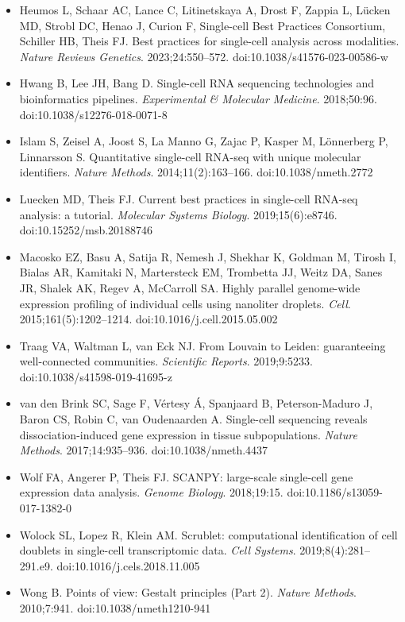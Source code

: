 \begin{itemize}
\item Heumos L, Schaar AC, Lance C, Litinetskaya A, Drost F, Zappia L, Lücken MD, Strobl DC, Henao J, Curion F, Single-cell Best Practices Consortium, Schiller HB, Theis FJ. Best practices for single-cell analysis across modalities. \textit{Nature Reviews Genetics}. 2023;24:550--572. doi:10.1038/s41576-023-00586-w
\item Hwang B, Lee JH, Bang D. Single-cell RNA sequencing technologies and bioinformatics pipelines. \textit{Experimental \& Molecular Medicine}. 2018;50:96. doi:10.1038/s12276-018-0071-8
\item Islam S, Zeisel A, Joost S, La Manno G, Zajac P, Kasper M, Lönnerberg P, Linnarsson S. Quantitative single-cell RNA-seq with unique molecular identifiers. \textit{Nature Methods}. 2014;11(2):163--166. doi:10.1038/nmeth.2772
\item Luecken MD, Theis FJ. Current best practices in single-cell RNA-seq analysis: a tutorial. \textit{Molecular Systems Biology}. 2019;15(6):e8746. doi:10.15252/msb.20188746
\item Macosko EZ, Basu A, Satija R, Nemesh J, Shekhar K, Goldman M, Tirosh I, Bialas AR, Kamitaki N, Martersteck EM, Trombetta JJ, Weitz DA, Sanes JR, Shalek AK, Regev A, McCarroll SA. Highly parallel genome-wide expression profiling of individual cells using nanoliter droplets. \textit{Cell}. 2015;161(5):1202--1214. doi:10.1016/j.cell.2015.05.002
\item Traag VA, Waltman L, van Eck NJ. From Louvain to Leiden: guaranteeing well-connected communities. \textit{Scientific Reports}. 2019;9:5233. doi:10.1038/s41598-019-41695-z
\item van den Brink SC, Sage F, Vértesy Á, Spanjaard B, Peterson-Maduro J, Baron CS, Robin C, van Oudenaarden A. Single-cell sequencing reveals dissociation-induced gene expression in tissue subpopulations. \textit{Nature Methods}. 2017;14:935--936. doi:10.1038/nmeth.4437
\item Wolf FA, Angerer P, Theis FJ. SCANPY: large-scale single-cell gene expression data analysis. \textit{Genome Biology}. 2018;19:15. doi:10.1186/s13059-017-1382-0
\item Wolock SL, Lopez R, Klein AM. Scrublet: computational identification of cell doublets in single-cell transcriptomic data. \textit{Cell Systems}. 2019;8(4):281--291.e9. doi:10.1016/j.cels.2018.11.005
\item Wong B. Points of view: Gestalt principles (Part 2). \textit{Nature Methods}. 2010;7:941. doi:10.1038/nmeth1210-941

\end{itemize}
